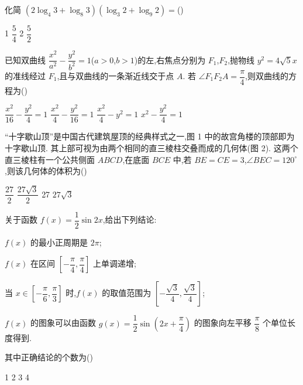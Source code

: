 \begin{problem}
化简 \(\left(2\log_4 3+\log_8 3\right)\left(\log_3 2+\log_9 2\right)=\)(\quad)

\choices
    {1}
    {\(\dfrac{5}{4}\)}
    {2}
    {\(\dfrac{5}{2}\)}
\end{problem}

\begin{problem}
已知双曲线 \(\dfrac{x^2}{a^2}-\dfrac{y^2}{b^2}=1\)(\(a>0\),\(b>1\))的左,右焦点分别为 \(F_1\),\(F_2\),抛物线 \(y^2=4\sqrt{5}x\) 的准线经过 \(F_1\),且与双曲线的一条渐近线交于点 \(A\). 若 \(\angle F_1F_2A=\dfrac{\pi}{4}\),则双曲线的方程为(\quad)

\choices
    {\(\dfrac{x^2}{16}-\dfrac{y^2}{4}=1\)}
    {\(\dfrac{x^2}{4}-\dfrac{y^2}{16}=1\)}
    {\(\dfrac{x^2}{4}-y^2=1\)}
    {\(x^2-\dfrac{y^2}{4}=1\)}
\end{problem}

\begin{problem}
``十字歇山顶''是中国古代建筑屋顶的经典样式之一,图 1 中的故宫角楼的顶部即为十字歇山顶. 其上部可视为由两个相同的直三棱柱交叠而成的几何体(图 2). 这两个直三棱柱有一个公共侧面 \(ABCD\),在底面 \(BCE\) 中,若 \(BE=CE=3\),\(\angle BEC=120^{\circ}\),则该几何体的体积为(\quad)


\choices
    {\(\dfrac{27}{2}\)}
    {\(\dfrac{27\sqrt{3}}{2}\)}
    {27}
    {\(27\sqrt{3}\)}
\end{problem}

\begin{problem}
关于函数 \(f(x)=\dfrac{1}{2}\sin 2x\),给出下列结论:

\begin{circlelist}
\item \(f(x)\) 的最小正周期是 \(2\pi\);
\item \(f(x)\) 在区间 \(\left[-\dfrac{\pi}{4},\dfrac{\pi}{4}\right]\) 上单调递增;
\item 当 \(x\in\left[-\dfrac{\pi}{6},\dfrac{\pi}{3}\right]\) 时,\(f(x)\) 的取值范围为 \(\left[-\dfrac{\sqrt{3}}{4},\dfrac{\sqrt{3}}{4}\right]\);
\item \(f(x)\) 的图象可以由函数 \(g(x)=\dfrac{1}{2}\sin\left(2x+\dfrac{\pi}{4}\right)\) 的图象向左平移 \(\dfrac{\pi}{8}\) 个单位长度得到.
\end{circlelist}
其中正确结论的个数为(\quad)

\choices
    {1}
    {2}
    {3}
    {4}
\end{problem}

